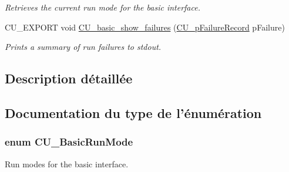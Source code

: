\begin{DoxyCompactItemize}
\begin{DoxyCompactList}\small\item\em Retrieves the current run mode for the basic interface. \end{DoxyCompactList}\item 
C\-U\-\_\-\-E\-X\-P\-O\-R\-T void \hyperlink{group__Basic_ga42f85f17df1cd5fd68d0c20be273a878}{C\-U\-\_\-basic\-\_\-show\-\_\-failures} (\hyperlink{group__Framework_gafe3d04f76bf2fac18a3b6a9fd9368308}{C\-U\-\_\-p\-Failure\-Record} p\-Failure)
\begin{DoxyCompactList}\small\item\em Prints a summary of run failures to stdout. \end{DoxyCompactList}\end{DoxyCompactItemize}


\subsection{Description détaillée}


\subsection{Documentation du type de l'énumération}
\hypertarget{group__Basic_ga2f7ec57f8b59cfef5c5600bafa4865a6}{
\subsubsection[{C\-U\-\_\-\-Basic\-Run\-Mode}]{\setlength{\rightskip}{0pt plus 5cm}enum {\bf C\-U\-\_\-\-Basic\-Run\-Mode}}}\label{group__Basic_ga2f7ec57f8b59cfef5c5600bafa4865a6}


Run modes for the basic interface. 

